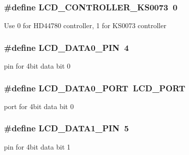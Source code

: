 \subsubsection[{\texorpdfstring{L\+C\+D\+\_\+\+C\+O\+N\+T\+R\+O\+L\+L\+E\+R\+\_\+\+K\+S0073}{LCD_CONTROLLER_KS0073}}]{\setlength{\rightskip}{0pt plus 5cm}\#define L\+C\+D\+\_\+\+C\+O\+N\+T\+R\+O\+L\+L\+E\+R\+\_\+\+K\+S0073~0}\hypertarget{group__pfleury__lcd_ga63574b03f72a197aeee823aae95dc3b7}{}\label{group__pfleury__lcd_ga63574b03f72a197aeee823aae95dc3b7}
Use 0 for H\+D44780 controller, 1 for K\+S0073 controller 
\subsubsection[{\texorpdfstring{L\+C\+D\+\_\+\+D\+A\+T\+A0\+\_\+\+P\+IN}{LCD_DATA0_PIN}}]{\setlength{\rightskip}{0pt plus 5cm}\#define L\+C\+D\+\_\+\+D\+A\+T\+A0\+\_\+\+P\+IN~4}\hypertarget{group__pfleury__lcd_gafe54d7d886b5c56bed0cf971febbb773}{}\label{group__pfleury__lcd_gafe54d7d886b5c56bed0cf971febbb773}
pin for 4bit data bit 0 
\subsubsection[{\texorpdfstring{L\+C\+D\+\_\+\+D\+A\+T\+A0\+\_\+\+P\+O\+RT}{LCD_DATA0_PORT}}]{\setlength{\rightskip}{0pt plus 5cm}\#define L\+C\+D\+\_\+\+D\+A\+T\+A0\+\_\+\+P\+O\+RT~{\bf L\+C\+D\+\_\+\+P\+O\+RT}}\hypertarget{group__pfleury__lcd_gafc0acd4774bcd311595732f5367e266b}{}\label{group__pfleury__lcd_gafc0acd4774bcd311595732f5367e266b}
port for 4bit data bit 0 
\subsubsection[{\texorpdfstring{L\+C\+D\+\_\+\+D\+A\+T\+A1\+\_\+\+P\+IN}{LCD_DATA1_PIN}}]{\setlength{\rightskip}{0pt plus 5cm}\#define L\+C\+D\+\_\+\+D\+A\+T\+A1\+\_\+\+P\+IN~5}\hypertarget{group__pfleury__lcd_ga97fb520e7b83bb047ac5c9247de57049}{}\label{group__pfleury__lcd_ga97fb520e7b83bb047ac5c9247de57049}
pin for 4bit data bit 1 
